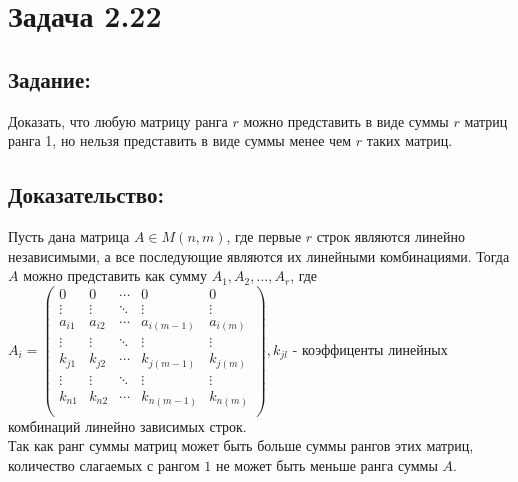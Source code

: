\section{Задача 2.22}
\subsection{Задание:}
Доказать, что любую матрицу ранга $ r $ можно представить в виде суммы $ r $
матриц ранга 1, но нельзя представить в виде суммы менее чем $ r $ таких матриц.
\subsection{Доказательство:}
Пусть дана матрица $ A \in M(n, m) $, где первые $ r $ строк являются линейно независимыми, а все последующие являются их
линейными комбинациями. Тогда $ A $ можно представить как сумму
$ A_1, A_2, \dots, A_r $, где
\\[1em]
$
	A_i =
	\begin{pmatrix}
		0 & 0 & \cdots & 0 & 0 \\
		\vdots & \vdots & \ddots & \vdots & \vdots \\
		a_{i1} & a_{i2} & \cdots & a_{i(m-1)} & a_{i(m)} \\
		\vdots & \vdots & \ddots & \vdots & \vdots \\
		k_{j1} & k_{j2} & \cdots & k_{j(m-1)} & k_{j(m)} \\
		\vdots & \vdots & \ddots & \vdots & \vdots \\
		k_{n1} & k_{n2} & \cdots & k_{n(m-1)} & k_{n(m)} \\
	\end{pmatrix}
	, k_{jl}
$ - коэффиценты линейных комбинаций линейно зависимых строк.
\\[1em]
Так как ранг суммы матриц может быть больше суммы рангов этих матриц, количество слагаемых
с рангом $ 1 $ не может быть меньше ранга суммы $ A $.
